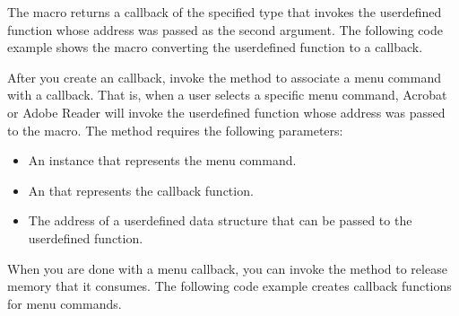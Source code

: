 \documentclass[letterpaper,12pt,english,openany,oneside]{sphinxmanual}
\begin{document}
The  macro returns a callback of the specified type that invokes the user\sphinxhyphen{}defined function whose address was passed as the second argument. The following code example shows the  macro converting the  user\sphinxhyphen{}defined function to a  callback.

\begin{sphinxVerbatim}[commandchars=\\\{\}]
   
    
\end{sphinxVerbatim}

After you create an  callback, invoke the  method to associate a menu command with a callback. That is, when a user selects a specific menu command, Acrobat or Adobe Reader will invoke the user\sphinxhyphen{}defined function whose address was passed to the  macro. The  method requires the following parameters:
\begin{itemize}
\item {} 
An  instance that represents the menu command.

\item {} 
An  that represents the callback function.

\item {} 
The address of a user\sphinxhyphen{}defined data structure that can be passed to the user\sphinxhyphen{}defined function.

\end{itemize}

When you are done with a menu callback, you can invoke the  method to release memory that it consumes. The following code example creates callback functions for menu commands.
\end{document}
